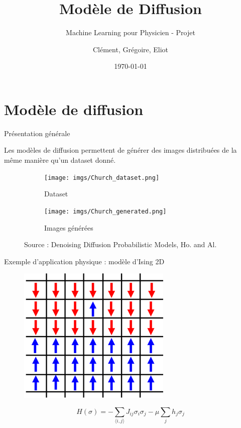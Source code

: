 \documentclass{beamer}
\begin{document}
	
	\title{Modèle de Diffusion}
	\subtitle{Machine Learning pour Physicien - Projet}
	\author{Clément, Grégoire, Eliot}
	\date{\today}
	
	\maketitle
	
	\section{Modèle de diffusion}
	
	\begin{frame}{Présentation générale}
		
		Les modèles de diffusion permettent de générer des images distribuées \alert{de la même manière} qu'un dataset donné.
		
		\begin{figure}
			\centering
			\begin{subfigure}[b]{0.4\textwidth}
				\centering
				\texttt{[image: imgs/Church\_dataset.png]}
				\caption*{Dataset}
			\end{subfigure}
			\begin{subfigure}[b]{0.4\textwidth}
				\centering
				\texttt{[image: imgs/Church\_generated.png]}
				\caption*{Images générées}
			\end{subfigure}
			\hfill
			\caption{Source : Denoising Diffusion Probabilistic Models, Ho. and Al.}
		\end{figure}
		
	\end{frame}

	\begin{frame}{Exemple d'application physique : modèle d'Ising 2D}
        \begin{figure}
            \centering
            \includegraphics[width=0.45\linewidth]{Ising_2D.png}
            \label{fig:enter-label}
        \end{figure}
        \begin{equation*}
            H(\sigma) = -\sum_{\langle i, j \rangle} J_{ij} \sigma_i \sigma_j - \mu \sum_j h_j \sigma_j
        \end{equation*}
        \end{frame}
\end{document}
